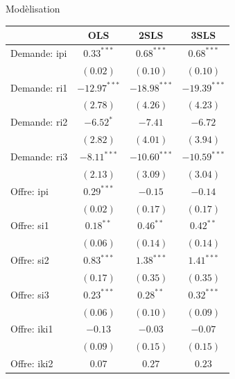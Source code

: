 \documentclass[11pt,ignorenonframetext,]{beamer}
\begin{document}
\begin{frame}{Modèlisation}
\protect\hypertarget{modelisation-1}{}

\tiny

\begin{table}[!htbp]
\begin{center}
\begin{tabular}{l c c c }
\hline
 & OLS & 2SLS & 3SLS \\
\hline
Demande: ipi        & $0.33^{***}$   & $0.68^{***}$   & $0.68^{***}$   \\
                    & $(0.02)$       & $(0.10)$       & $(0.10)$       \\
Demande: ri1        & $-12.97^{***}$ & $-18.98^{***}$ & $-19.39^{***}$ \\
                    & $(2.78)$       & $(4.26)$       & $(4.23)$       \\
Demande: ri2        & $-6.52^{*}$    & $-7.41$        & $-6.72$        \\
                    & $(2.82)$       & $(4.01)$       & $(3.94)$       \\
Demande: ri3        & $-8.11^{***}$  & $-10.60^{***}$ & $-10.59^{***}$ \\
                    & $(2.13)$       & $(3.09)$       & $(3.04)$       \\
Offre: ipi          & $0.29^{***}$   & $-0.15$        & $-0.14$        \\
                    & $(0.02)$       & $(0.17)$       & $(0.17)$       \\
Offre: si1          & $0.18^{**}$    & $0.46^{**}$    & $0.42^{**}$    \\
                    & $(0.06)$       & $(0.14)$       & $(0.14)$       \\
Offre: si2          & $0.83^{***}$   & $1.38^{***}$   & $1.41^{***}$   \\
                    & $(0.17)$       & $(0.35)$       & $(0.35)$       \\
Offre: si3          & $0.23^{***}$   & $0.28^{**}$    & $0.32^{***}$   \\
                    & $(0.06)$       & $(0.10)$       & $(0.09)$       \\
Offre: iki1         & $-0.13$        & $-0.03$        & $-0.07$        \\
                    & $(0.09)$       & $(0.15)$       & $(0.15)$       \\
Offre: iki2         & $0.07$         & $0.27$         & $0.23$         \\

\end{tabular}
\end{center}
\end{table}
\end{frame}
\end{document}
